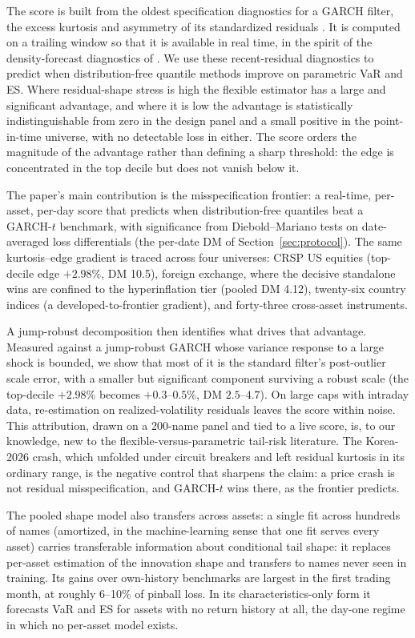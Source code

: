 \documentclass[11pt]{article}
\theoremstyle{remark}
\begin{document}
The score is built from the oldest specification diagnostics for a
GARCH filter, the excess kurtosis and asymmetry of its standardized
residuals \citep{bollerslev1987, hansen1994ARCD}. It is computed on a
trailing window so that it is available in real time, in the spirit of
the density-forecast diagnostics of \citet{berkowitz2001}. We use these recent-residual diagnostics to predict when distribution-free quantile methods improve on parametric VaR and ES. Where residual-shape stress is high the flexible estimator has a large and significant advantage, and where it is low the advantage is statistically indistinguishable from zero in the design panel and a small positive in the point-in-time universe, with no detectable loss in either. The score orders the magnitude of the advantage rather than defining a sharp threshold: the edge is concentrated in the top decile but does not vanish below it.

\medskip\noindent The paper's main contribution is the misspecification frontier: a real-time, per-asset, per-day score that predicts when distribution-free quantiles beat a GARCH-$t$ benchmark, with significance from Diebold--Mariano tests on date-averaged loss differentials (the per-date DM of Section~\ref{sec:protocol}). The same kurtosis--edge gradient is traced across four universes: CRSP US equities (top-decile edge $+2.98\%$, DM 10.5), foreign exchange, where the decisive standalone wins are confined to the hyperinflation tier (pooled DM 4.12), twenty-six country indices (a developed-to-frontier gradient), and forty-three cross-asset instruments.

A jump-robust decomposition then identifies what drives that advantage. Measured against a jump-robust GARCH whose variance response to a large shock is bounded, we show that most of it is the standard filter's post-outlier scale error, with a smaller but significant component surviving a robust scale (the top-decile $+2.98\%$ becomes $+0.3$--$0.5\%$, DM $2.5$--$4.7$). On large caps with intraday data, re-estimation on realized-volatility residuals leaves the score within noise. This attribution, drawn on a 200-name panel and tied to a live score, is, to our knowledge, new to the flexible-versus-parametric tail-risk literature. The Korea-2026 crash, which unfolded under circuit breakers and left residual kurtosis in its ordinary range, is the negative control that sharpens the claim: a price crash is not residual misspecification, and GARCH-$t$ wins there, as the frontier predicts.

The pooled shape model also transfers across assets: a single fit across hundreds of names (amortized, in the machine-learning sense that one fit serves every asset) carries transferable information about conditional tail shape: it replaces per-asset estimation of the innovation shape and transfers to names never seen in training. Its gains over own-history benchmarks are largest in the first trading month, at roughly 6--10\% of pinball loss. In its characteristics-only form it forecasts VaR and ES for assets with no return history at all, the day-one regime in which no per-asset model exists.
\end{document}
